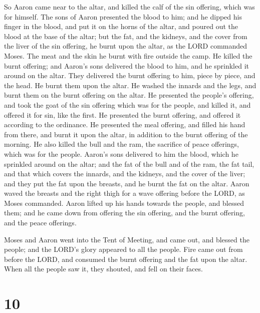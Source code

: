  So Aaron came near to the altar, and killed the calf of
the sin offering, which was for himself.  The sons of
Aaron presented the blood to him; and he dipped his finger in the blood,
and put it on the horns of the altar, and poured out the blood at the
base of the altar;  but the fat, and the kidneys, and the
cover from the liver of the sin offering, he burnt upon the altar, as
the LORD commanded Moses.  The meat and the skin he burnt
with fire outside the camp.  He killed the burnt
offering; and Aaron's sons delivered the blood to him, and he sprinkled
it around on the altar.  They delivered the burnt
offering to him, piece by piece, and the head. He burnt them upon the
altar.  He washed the innards and the legs, and burnt
them on the burnt offering on the altar.  He presented
the people's offering, and took the goat of the sin offering which was
for the people, and killed it, and offered it for sin, like the first.
 He presented the burnt offering, and offered it
according to the ordinance.  He presented the meal
offering, and filled his hand from there, and burnt it upon the altar,
in addition to the burnt offering of the morning.  He
also killed the bull and the ram, the sacrifice of peace offerings,
which was for the people. Aaron's sons delivered to him the blood, which
he sprinkled around on the altar;  and the fat of the
bull and of the ram, the fat tail, and that which covers the innards,
and the kidneys, and the cover of the liver;  and they
put the fat upon the breasts, and he burnt the fat on the altar.
 Aaron waved the breasts and the right thigh for a wave
offering before the LORD, as Moses commanded.  Aaron
lifted up his hands towards the people, and blessed them; and he came
down from offering the sin offering, and the burnt offering, and the
peace offerings.

 Moses and Aaron went into the Tent of Meeting, and came
out, and blessed the people; and the LORD's glory appeared to all the
people.  Fire came out from before the LORD, and consumed
the burnt offering and the fat upon the altar. When all the people saw
it, they shouted, and fell on their faces.

\hypertarget{section-9}{%
\section{10}\label{section-9}}

